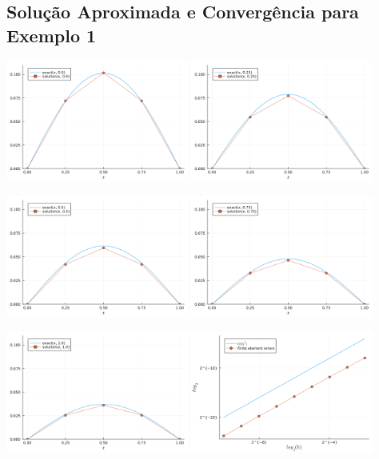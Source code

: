 \documentclass[a4paper]{article}
\begin{document}
\subsection{Solução Aproximada e Convergência para Exemplo 1}

\includegraphics[width=0.45\textwidth]{images/solucao_aprox-0}
\includegraphics[width=0.45\textwidth]{images/solucao_aprox-1}

\includegraphics[width=0.45\textwidth]{images/solucao_aprox-2}
\includegraphics[width=0.45\textwidth]{images/solucao_aprox-3}

\includegraphics[width=0.45\textwidth]{images/solucao_aprox-4}
\includegraphics[width=0.45\textwidth]{images/convergencia_erro}
\end{document}
